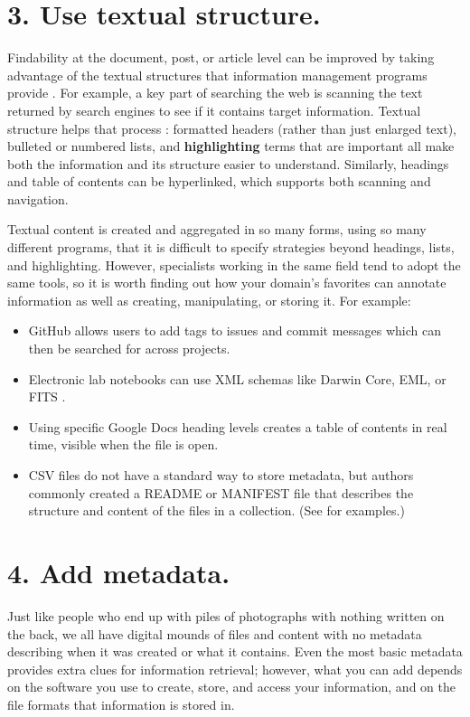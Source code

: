 \documentclass[10pt,letterpaper]{article}
\newcommand{\rulemajor}[1]{\section*{#1}}
\begin{document}
\rulemajor{3. Use textual structure.}

Findability at the document, post, or article level can be improved by taking
advantage of the textual structures that information management programs provide
\cite{Hedden2016}. For example, a key part of searching the web is scanning the
text returned by search engines to see if it contains target information.
Textual structure helps that process \cite{Krug2014}: formatted headers (rather
than just enlarged text), bulleted or numbered lists, and \textbf{highlighting}
terms that are important all make both the information and its structure easier
to understand. Similarly, headings and table of contents can be hyperlinked,
which supports both scanning and navigation.

Textual content is created and aggregated in so many forms, using so many
different programs, that it is difficult to specify strategies beyond headings,
lists, and highlighting. However, specialists working in the same field tend to
adopt the same tools, so it is worth finding out how your domain's favorites can
annotate information as well as creating, manipulating, or storing it. For
example:

\begin{itemize}

\item
  GitHub allows users to add tags to issues and commit messages which can then
  be searched for across projects.

\item
  Electronic lab notebooks can use XML schemas like Darwin Core, EML, or FITS
  \cite{Briney2015}.

\item
  Using specific Google Docs heading levels creates a table of contents in real
  time, visible when the file is open.

\item
  CSV files do not have a standard way to store metadata, but authors commonly
  created a README or MANIFEST file that describes the structure and content of
  the files in a collection. (See \cite{Pudding} for examples.)

\end{itemize}

\rulemajor{4. Add metadata.}

Just like people who end up with piles of photographs with nothing written on
the back, we all have digital mounds of files and content with no metadata
describing when it was created or what it contains. Even the most basic metadata
provides extra clues for information retrieval; however, what you can add
depends on the software you use to create, store, and access your information,
and on the file formats that information is stored in.
\end{document}
